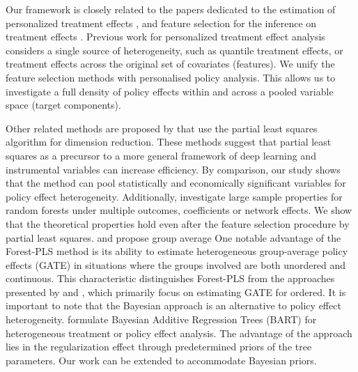 \documentclass[12pt]{article}
\begin{document}
Our framework is closely related to the papers dedicated to the estimation of personalized treatment effects \citep{athey2015machine, athey2016recursive, wager2018estimation, chernozhukov2018generic, chernozhukov2018sorted, kunzel2019metalearners, hahn2020bayesian, nie2021quasi, xiong2021federated}, and 
feature selection for the inference on treatment effects \citep{belloni2012sparse, belloni2014inference, chernozhukov2015valid, chernozhukov2015post, urminsky2016using, banerjee2021selecting}.  Previous work for personalized treatment effect analysis considers a single source of heterogeneity, such as quantile treatment effects, or treatment effects across the original set of covariates (features). We unify the feature selection methods with personalised policy analysis. This allows us to investigate a full density of policy effects within and across a pooled variable space (target components).  



Other related methods are proposed by \cite{ hahn2002capturing, chun2010sparse, mehmood2012review, mehmood2020comparison, polson2021deep, nareklishvili2022deep, dixon2022deep} that use the partial least squares algorithm for dimension reduction. These methods suggest that partial least squares as a precursor to a more general framework of deep learning and instrumental variables can increase efficiency. By comparison, our study shows that the method can pool statistically and economically significant variables for policy effect heterogeneity. Additionally, \cite{nekipelov2018moment, li2020asymptotic, nareklishvili2022adaptive} investigate large sample properties for random forests under multiple outcomes, coefficients or network effects. We show that the theoretical properties hold even after the feature selection procedure by partial least squares. \cite{chernozhukov2018generic} and \cite{jacob2019group} propose group average 
One notable advantage of the Forest-PLS method is its ability to estimate heterogeneous group-average policy effects (GATE) in situations where the groups involved are both unordered and continuous. This characteristic distinguishes Forest-PLS from the approaches presented by  \cite{chernozhukov2018generic} and  \cite{jacob2019group}, which primarily focus on estimating GATE for ordered. It is important to note that the Bayesian approach is an alternative to policy effect heterogeneity. \cite{ansari2000hierarchical, taddy2016nonparametric, santos2018tree, hahn2020bayesian, woody2020estimating, starling2021targeted, krantsevich2022stochastic, he2023stochastic} formulate Bayesian Additive Regression Trees (BART) for heterogeneous treatment or policy effect analysis. The advantage of the approach lies in the regularization effect through predetermined priors of the tree parameters. Our work can be extended to accommodate Bayesian priors. 
\end{document}
